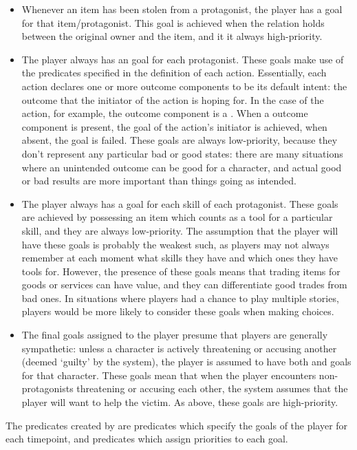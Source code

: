 \begin{enumerate}
\begin{itemize}
\item Whenever an item has been stolen from a protagonist, the player has a  goal for that item/protagonist. This goal is achieved when the  relation holds between the original owner and the item, and it it always high-priority.
\item The player always has an  goal for each protagonist. These goals make use of the  predicates specified in the definition of each action. Essentially, each action declares one or more outcome components to be its default intent: the outcome that the initiator of the action is hoping for. In the case of the  action, for example, the outcome component  is a . When a  outcome component is present, the  goal of the action's initiator is achieved, when absent, the goal is failed. These goals are always low-priority, because they don't represent any particular bad or good states: there are many situations where an unintended outcome can be good for a character, and actual good or bad results are more important than things going as intended.
\item The player always has a  goal for each skill of each protagonist. These goals are achieved by possessing an item which counts as a tool for a particular skill, and they are always low-priority. The assumption that the player will have these goals is probably the weakest such, as players may not always remember at each moment what skills they have and which ones they have tools for. However, the presence of these goals means that trading items for goods or services can have value, and they can differentiate good trades from bad ones. In situations where players had a chance to play multiple stories, players would be more likely to consider these goals when making choices.
\item The final goals assigned to the player presume that players are generally sympathetic: unless a character is actively threatening or accusing another (deemed `guilty' by the system), the player is assumed to have both  and  goals for that character. These goals mean that when the player encounters non-protagonists threatening or accusing each other, the system assumes that the player will want to help the victim. As above, these goals are high-priority.
\end{itemize}
%
The predicates created by  are  predicates which specify the goals of the player for each timepoint, and  predicates which assign priorities to each goal.



\end{enumerate}
